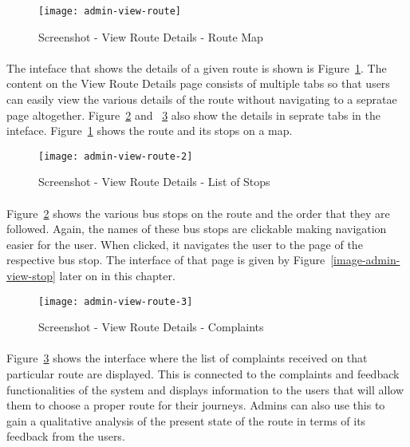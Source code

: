 \begin {figure} [H]
\centering
\texttt{[image: admin-view-route]}
\caption [Screenshot - View Route Details - Route Map] {Screenshot - View Route Details - Route Map}
\label {image-admin-view-route}
\end {figure}

\paragraph{} The inteface that shows the details of a given route is shown is Figure~\ref{image-admin-view-route}. The content on the View Route Details page consists of multiple tabs so that users can easily view the various details of the route without navigating to a sepratae page altogether. Figure~\ref{image-admin-view-route-2} and ~\ref{image-admin-view-route-3} also show the details in seprate tabs in the inteface. Figure~\ref{image-admin-view-route} shows the route and its stops on a map.

\begin {figure} [H]
\centering
\texttt{[image: admin-view-route-2]}
\caption [Screenshot - View Route Details - List of Stops] {Screenshot - View Route Details - List of Stops}
\label {image-admin-view-route-2}
\end {figure}

\paragraph{} Figure~\ref{image-admin-view-route-2} shows the various bus stops on the route and the order that they are followed. Again, the names of these bus stops are clickable making navigation easier for the user. When clicked, it navigates the user to the page of the respective bus stop. The interface of that page is given by Figure~\ref{image-admin-view-stop}  later on in this chapter.

\begin {figure} [H]
\centering
\texttt{[image: admin-view-route-3]}
\caption [Screenshot - View Route Details - Complaints] {Screenshot - View Route Details - Complaints}
\label {image-admin-view-route-3}
\end {figure}

\paragraph{} Figure~\ref{image-admin-view-route-3} shows the interface where the list of complaints received on that particular route are displayed. This is connected to the complaints and feedback functionalities of the system and displays information to the users that will allow them to choose a proper route for their journeys. Admins can also use this to gain a qualitative analysis of the present state of the route in terms of its feedback from the users.

